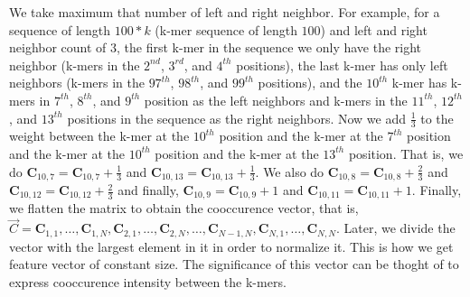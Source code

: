 \documentclass[oneside, twocolumn, a4paper, 10pt]{IEEEtran}
\begin{document}
We take maximum that number of left and right neighbor. For example, for a sequence of length $100 * k$ (k-mer sequence of length $100$) and left and right neighbor count of $3$, the first k-mer in the sequence we only have the right neighbor (k-mers in the $2^{nd}$, $3^{rd}$, and $4^{th}$ positions), the last k-mer has only left neighbors (k-mers in the $97^{th}$, $98^{th}$, and $99^{th}$ positions), and the $10^{th}$ k-mer has k-mers in $7^{th}$, $8^{th}$, and $9^{th}$ position as the left neighbors and k-mers in the $11^{th}$, $12^{th}$, and $13^{th}$ positions in the sequence as the right neighbors. Now we add $\frac{1}{3}$ to the weight between the k-mer at the $10^{th}$ position and the k-mer at the $7^{th}$ position and the k-mer at the $10^{th}$ position and the k-mer at the $13^{th}$ position. That is, we do $\mathbf{C}_{10, 7} = \mathbf{C}_{10, 7} + \frac{1}{3}$ and $\mathbf{C}_{10, 13} = \mathbf{C}_{10, 13} + \frac{1}{3}$. We also do $\mathbf{C}_{10, 8} = \mathbf{C}_{10, 8} + \frac{2}{3}$ and $\mathbf{C}_{10, 12} = \mathbf{C}_{10, 12} + \frac{2}{3}$ and finally, $\mathbf{C}_{10, 9} = \mathbf{C}_{10, 9} + 1$ and $\mathbf{C}_{10, 11} = \mathbf{C}_{10, 11} + 1$. Finally, we flatten the matrix to obtain the cooccurence vector, that is, $\vec{C} = \mathbf{C}_{1,1}, \ldots, \mathbf{C}_{1, N}, \mathbf{C}_{2, 1}, \ldots, \mathbf{C}_{2, N}, \ldots, \mathbf{C}_{N-1, N},\mathbf{C}_{N, 1}, \ldots, \mathbf{C}_{N, N}$. Later, we divide the vector with the largest element in it in order to normalize it. This is how we get feature vector of constant size. The significance of this vector can be thoght of to express cooccurence intensity between the k-mers.
\end{document}
